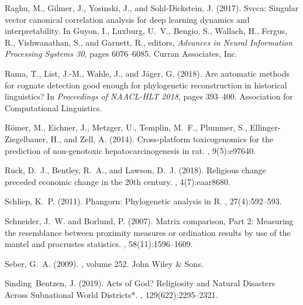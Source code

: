 \documentclass[a4]{article}
\newcommand{\+}[1]{\mathbf{#1}}
\begin{document}
\begin{thebibliography}{}
Raghu, M., Gilmer, J., Yosinski, J., and Sohl-Dickstein, J. (2017).
\newblock Svcca: Singular vector canonical correlation analysis for deep
  learning dynamics and interpretability.
\newblock In Guyon, I., Luxburg, U.~V., Bengio, S., Wallach, H., Fergus, R.,
  Vishwanathan, S., and Garnett, R., editors, {\em Advances in Neural
  Information Processing Systems 30}, pages 6076--6085. Curran Associates, Inc.

Rama, T., List, J.-M., Wahle, J., and J\"{a}ger, G. (2018).
\newblock Are automatic methods for cognate detection good enough for
  phylogenetic reconstruction in historical linguistics?
\newblock In {\em Proceedings of NAACL-HLT 2018}, pages 393--400. Association
  for Computational Linguistics.

R\"omer, M., Eichner, J., Metzger, U., Templin, M.~F., Plummer, S.,
  {Ellinger-Ziegelbauer}, H., and Zell, A. (2014).
\newblock Cross-platform toxicogenomics for the prediction of non-genotoxic
  hepatocarcinogenesis in rat.
, 9(5):e97640.

Ruck, D.~J., Bentley, R.~A., and Lawson, D.~J. (2018).
\newblock Religious change preceded economic change in the 20th century.
, 4(7):eaar8680.

Schliep, K.~P. (2011).
\newblock Phangorn: Phylogenetic analysis in {{R}}.
, 27(4):592--593.

Schneider, J.~W. and Borlund, P. (2007).
\newblock Matrix comparison, {{Part}} 2: {{Measuring}} the resemblance between
  proximity measures or ordination results by use of the mantel and procrustes
  statistics.
, 58(11):1596--1609.

Seber, G.~A. (2009).
, volume 252.
\newblock John Wiley \& Sons.

Sinding~Bentzen, J. (2019).
\newblock Acts of {God}? {Religiosity} and {Natural} {Disasters} {Across}
  {Subnational} {World} {Districts}*.
, 129(622):2295--2321.


\end{thebibliography}
\end{document}
